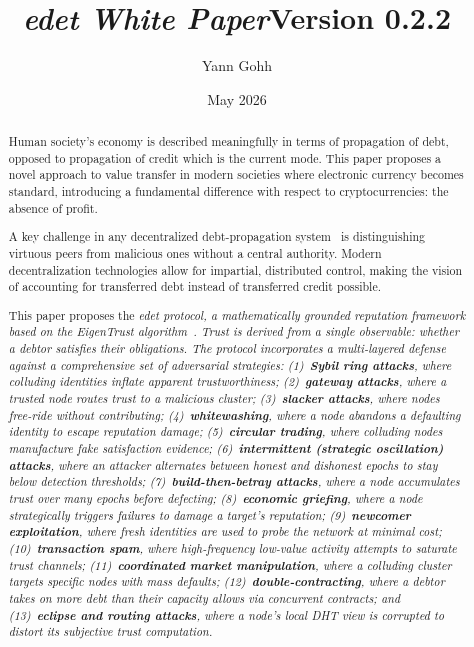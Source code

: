 \documentclass[11pt]{article}
\title{\textbf{\em edet \em White Paper}\linebreak\small{Version 0.2.2}}
\author{Yann Gohh}
\date{May 2026}
\begin{document}
\maketitle


\newpage
\begin{abstract}
Human society's economy is described meaningfully in terms of propagation of debt, opposed to propagation of credit which is the current mode. This paper proposes a novel approach to value transfer in modern societies where electronic currency becomes standard, introducing a fundamental difference with respect to cryptocurrencies: the absence of profit.

A key challenge in any decentralized debt-propagation system~\cite{fugger2004,lietaer2001,greco2009} is distinguishing virtuous peers from malicious ones without a central authority. Modern decentralization technologies allow for impartial, distributed control, making the vision of accounting for transferred debt instead of transferred credit possible.

This paper proposes the \em edet \em protocol, a mathematically grounded reputation framework based on the EigenTrust algorithm~\cite{kamvar2003}. Trust is derived from a single observable: \emph{whether a debtor satisfies their obligations}. The protocol incorporates a multi-layered defense against a comprehensive set of adversarial strategies: (1)~\textbf{Sybil ring attacks}, where colluding identities inflate apparent trustworthiness; (2)~\textbf{gateway attacks}, where a trusted node routes trust to a malicious cluster; (3)~\textbf{slacker attacks}, where nodes free-ride without contributing; (4)~\textbf{whitewashing}, where a node abandons a defaulting identity to escape reputation damage; (5)~\textbf{circular trading}, where colluding nodes manufacture fake satisfaction evidence; (6)~\textbf{intermittent (strategic oscillation) attacks}, where an attacker alternates between honest and dishonest epochs to stay below detection thresholds; (7)~\textbf{build-then-betray attacks}, where a node accumulates trust over many epochs before defecting; (8)~\textbf{economic griefing}, where a node strategically triggers failures to damage a target's reputation; (9)~\textbf{newcomer exploitation}, where fresh identities are used to probe the network at minimal cost; (10)~\textbf{transaction spam}, where high-frequency low-value activity attempts to saturate trust channels; (11)~\textbf{coordinated market manipulation}, where a colluding cluster targets specific nodes with mass defaults; (12)~\textbf{double-contracting}, where a debtor takes on more debt than their capacity allows via concurrent contracts; and (13)~\textbf{eclipse and routing attacks}, where a node's local DHT view is corrupted to distort its subjective trust computation.


\end{abstract}
\end{document}
